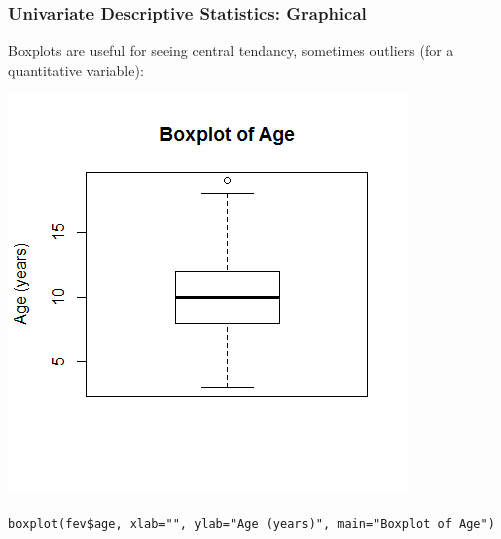 \documentclass[12pt, 
hyperref={colorlinks=true, linkcolor=blue, urlcolor=cyan}]{beamer}
\begin{document}
\begin{frame}
\frametitle{Univariate Descriptive Statistics: Graphical}

Boxplots are useful for seeing central tendancy, sometimes outliers (for a quantitative variable):\vspace{-0.8cm}

\center \includegraphics[height=0.7\textheight]{./boxplot-age}

\vspace{-1cm} \begin{scriptsize} \texttt{boxplot(fev\$age, xlab="", ylab="Age (years)", main="Boxplot of Age")} \end{scriptsize}

\end{frame}
\end{document}
